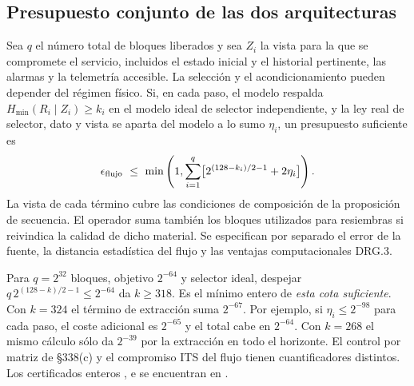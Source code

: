 \subsection{Presupuesto conjunto de las dos arquitecturas}
\label{sec:source-budget}
Sea \(q\) el número total de bloques liberados y sea \(Z_i\) la vista para la
que se compromete el servicio, incluidos el estado inicial y el historial
pertinente, las alarmas y la telemetría accesible. La selección y el
acondicionamiento pueden depender del régimen físico. Si, en cada paso,
el modelo respalda \(H_{\min}(R_i\mid Z_i)\ge k_i\) en el modelo ideal
de selector independiente, y la ley real de selector, dato y vista se aparta
del modelo a lo sumo \(\eta_i\), un presupuesto suficiente es
\[
 \epsilon_{\rm flujo}\ \le\ \min\left(1,
 \sum_{i=1}^{q}\bigl[2^{(128-k_i)/2-1}+2\eta_i\bigr]\right).
\]
La vista de cada término cubre las condiciones de composición de la
proposición de secuencia. El operador suma también los bloques utilizados
para resiembras si reivindica la calidad de dicho material. Se especifican por
separado el error de la fuente, la distancia estadística del flujo y las
ventajas computacionales DRG.3.

Para \(q=2^{32}\) bloques, objetivo \(2^{-64}\) y selector ideal, despejar
\(q\,2^{(128-k)/2-1}\le2^{-64}\) da \(k\ge318\). Es el mínimo
entero de \emph{esta cota suficiente}. Con \(k=324\) el término de extracción
suma \(2^{-67}\). Por ejemplo, si \(\eta_i\le2^{-98}\) para cada paso,
el coste adicional es \(2^{-65}\) y el total cabe en \(2^{-64}\).
Con \(k=268\) el mismo cálculo sólo da \(2^{-39}\) por la extracción en
todo el horizonte. El control por matriz de §338(c) y el compromiso ITS del
flujo tienen cuantificadores distintos. Los certificados enteros
,  e 
se encuentran en .

